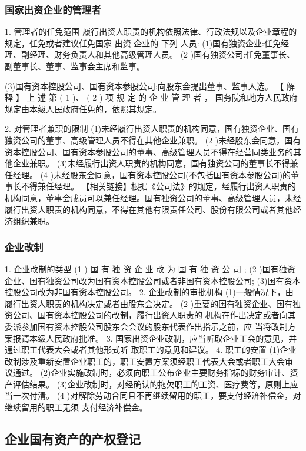 \documentclass[UTF8,12pt]{ctexart}
\numberwithin{equation}{section} %
\numberwithin{figure}{section}
\numberwithin{table}{section}
\begin{document}
	\subsubsection{国家出资企业的管理者}
	
	1. 管理者的任免范围
	履行出资人职责的机构依照法律、行政法规以及企业章程的规定，任免或者建议任免国家
	出资 企业的 下列 人员:
	(1)国有独资企业:任免经理、副经理、财务负责人和其他高级管理人员。
	(2 )国有独资公司:任免董事长、副董事长、董事、监事会主席和监事。
	
	
	(3)国有资本控股公司、国有资本参股公司:向股东会提出董事、监事人选。
	【 解 释 】 上 述 第 ( 1 )、 ( 2 ) 项 规 定 的 企 业 管 理 者 ， 国务院和地方人民政府规定由本级人民政府任免的，依照其规定。
	
	2. 对管理者兼职的限制
	(1)未经履行出资人职责的机构同意，国有独资企业、国有独资公司的董事、高级管理人员不得在其他企业兼职。
	(2 )未经股东会同意，国有资本控股公司、国有资本参股公司的董事、高级管理人员不得在经营同类业务的其他企业兼职。
	(3)未经履行出资人职责的机构同意，国有独资公司的董事长不得兼任经理。
	(4 )未经股东会同意，国有资本控股公司(不包括国有资本参股公司)的董事长不得兼任经理。
	【相关链接】根据《公司法》的规定，经履行出资人职责的机构同意，董事会成员可以兼任经理。国有独资公司的董事、高级管理人员，未经履行出资人职责的机构同意，不得在其他有限责任公司、股份有限公司或者其他经济组织兼职。
	
	\subsubsection{企业改制}
	1. 企业改制的类型
	(1 ) 国 有 独 资 企 业 改 为 国 有 独 资 公 司 ;
	(2 )国有独资企业、国有独资公司改为国有资本控股公司或者非国有资本控股公司;
	(3)国有资本控股公司改为非国有资本控股公司。
	2. 企业改制的审批机构
	(1)一般情况下，由履行出资人职责的机构决定或者由股东会决定。
	(2 )重要的国有独资企业、国有独资公司、国有资本控股公司的改制，履行出资人职责的
	机构在作出决定或者向其委派参加国有资本控股公司股东会会议的股东代表作出指示之前，应
	当将改制方案报请本级人民政府批准。
	3. 国家出资企业改制，应当听取企业工会的意见，并通过职工代表大会或者其他形式听
	取职工的意见和建议。
	4. 职工的安置
	(1)企业改制涉及重新安置企业职工的，职工安置方案须经职工代表大会或者职工大会审
	议通过。
	(2)企业实施改制时，必须向职工公布企业主要财务指标的财务审计、资产评估结果。
	(3)企业改制时，对经确认的拖欠职工的工资、医疗费等，原则上应当一次付清。
	(4 )对解除劳动合同且不再继续留用的职工，要支付经济补偿金，对继续留用的职工无须
	支付经济补偿金。
	
	\subsection{企业国有资产的产权登记}
	
\end{document}
